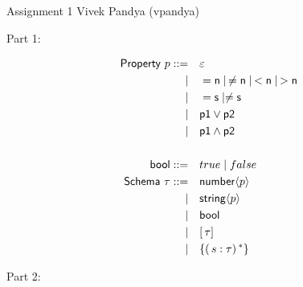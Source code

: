 \documentclass[11pt]{article}
\newcommand{\prop}[1]{\langle{#1}\rangle}%
\begin{document}
\hwtitle
  {Assignment 1}
  {Vivek Pandya (vpandya)} %


Part 1:

\begin{alignat*}{1}
\msf{Property}~p ::= \qamp \varepsilon \\
\mid \qamp = \msf{n} \mid \, \ne \msf{n} \mid  \, < \msf{n} \mid \, > \msf{n} \\
\mid \qamp = \msf{s} \mid \ne \msf{s} \\
\mid \qamp \msf{p1} \vee \msf{p2} \\
\mid \qamp \msf{p1} \wedge \msf{p2} \\
\\
\msf{bool} ::= \qamp true \mid false \\
\msf{Schema}~\tau ::= \qamp \tnum \prop{p} \\
\mid \qamp \tstr \prop{p}\\
\mid \qamp \msf{bool} \\
\mid \qamp [\, \tau ]\, \\
\mid \qamp \{ (\, s : \tau)\, ^{*}\} \\
\end{alignat*}

Part 2:
\end{document}
